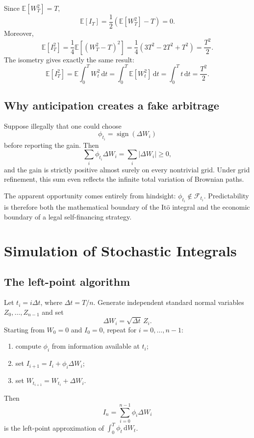 \documentclass[10pt]{article}
\newcommand{\E}{\mathbb E}
\newcommand{\1}{\mathbf 1}
\newcommand{\cF}{\mathcal F}
\newcommand{\dd}{\,\mathrm d}
\newcommand{\Ito}{\mathrm{It\hat{o}}}
\theoremstyle{definition}
\begin{document}
\begin{shortsolution}
Since \(\E[W_T^2]=T\),
\[
\E[I_T]=\frac12(\E[W_T^2]-T)=0.
\]
Moreover,
\[
\E[I_T^2]
=\frac14\E[(W_T^2-T)^2]
=\frac14(3T^2-2T^2+T^2)
=\frac{T^2}{2}.
\]
The isometry gives exactly the same result:
\[
\E[I_T^2]
=\E\int_0^TW_t^2\dd t
=\int_0^T\E[W_t^2]\dd t
=\int_0^Tt\dd t
=\frac{T^2}{2}.
\]
\end{shortsolution}

\subsection{Why anticipation creates a fake arbitrage}

Suppose illegally that one could choose
\[
\phi_{t_i}=\operatorname{sign}(\Delta W_i)
\]
before reporting the gain. Then
\[
\sum_i\phi_{t_i}\Delta W_i=\sum_i|\Delta W_i|\geq0,
\]
and the gain is strictly positive almost surely on every nontrivial grid.
Under grid refinement, this sum even reflects the infinite total variation of
Brownian paths.

The apparent opportunity comes entirely from hindsight:
\(\phi_{t_i}\notin\cF_{t_i}\). Predictability is therefore both the
mathematical boundary of the \(\Ito\) integral and the economic boundary of a
legal self-financing strategy.

\clearpage
\section{Simulation of Stochastic Integrals}

\subsection{The left-point algorithm}

Let \(t_i=i\Delta t\), where \(\Delta t=T/n\). Generate independent standard
normal variables \(Z_0,\ldots,Z_{n-1}\) and set
\[
\Delta W_i=\sqrt{\Delta t}\,Z_i.
\]
Starting from \(W_0=0\) and \(I_0=0\), repeat for \(i=0,\ldots,n-1\):
\begin{enumerate}
  \item compute \(\phi_i\) from information available at \(t_i\);
  \item set \(I_{i+1}=I_i+\phi_i\Delta W_i\);
  \item set \(W_{t_{i+1}}=W_{t_i}+\Delta W_i\).
\end{enumerate}
Then
\[
I_n=\sum_{i=0}^{n-1}\phi_i\Delta W_i
\]
is the left-point approximation of \(\int_0^T\phi_t\dd W_t\).
\end{document}
